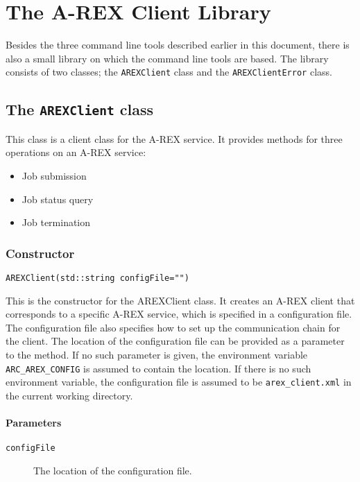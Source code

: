 \section{The A-REX Client Library}
\label{app:library}

Besides the three command line tools described earlier in this
document, there is also a small library on which the command line
tools are based. The library consists of two classes; the
\verb:AREXClient: class and the \verb:AREXClientError: class.

\subsection{The \texttt{AREXClient} class}

This class is a client class for the A-REX service. It provides
methods for three operations on an A-REX service:
\begin{itemize}
\item Job submission
\item Job status query
\item Job termination
\end{itemize}


\subsubsection{Constructor}

\begin{shaded}
\verb#AREXClient(std::string configFile="")#
\end{shaded}

This is the constructor for the AREXClient class. It creates an A-REX
client that corresponds to a specific A-REX service, which is
specified in a configuration file. The configuration file also
specifies how to set up the communication chain for the client. The
location of the configuration file can be provided as a parameter to
the method. If no such parameter is given, the environment variable
\verb:ARC_AREX_CONFIG: is assumed to contain the location. If there is
no such environment variable, the configuration file is assumed to be
\verb:arex_client.xml: in the current working directory.

\paragraph{Parameters}
\begin{description}
\item[\texttt{configFile}] The location of the configuration file.
\end{description}

